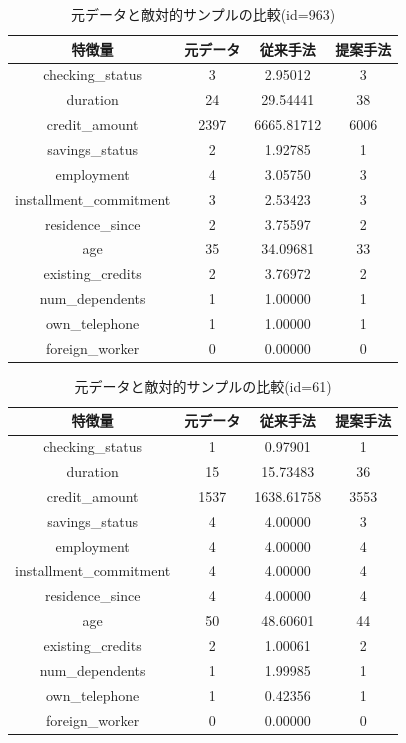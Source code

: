 \begin{table}[H]
    \centering
    \caption{元データと敵対的サンプルの比較(id=963)}
    \begin{tabular}{|c|c|c|c|} \hline
        特徴量 & 元データ & 従来手法 & 提案手法 \\ \hline
        checking\_status & 3 & 2.95012 & 3 \\ \hline
        duration & 24 & 29.54441 & 38 \\ \hline
        credit\_amount & 2397 & 6665.81712 & 6006 \\ \hline
        savings\_status & 2 & 1.92785 & 1 \\ \hline
        employment & 4 & 3.05750 & 3 \\ \hline
        installment\_commitment & 3 & 2.53423 & 3 \\ \hline
        residence\_since & 2 & 3.75597 & 2 \\ \hline
        age & 35 & 34.09681 & 33 \\ \hline
        existing\_credits & 2 & 3.76972 & 2 \\ \hline
        num\_dependents & 1 & 1.00000 & 1 \\ \hline
        own\_telephone & 1 & 1.00000 & 1 \\ \hline
        foreign\_worker & 0 & 0.00000 & 0 \\ \hline
    \end{tabular}
\end{table}

\begin{table}[H]
    \centering
    \caption{元データと敵対的サンプルの比較(id=61)}
    \begin{tabular}{|c|c|c|c|} \hline
        特徴量 & 元データ & 従来手法 & 提案手法 \\ \hline
        checking\_status & 1 & 0.97901 & 1 \\ \hline
        duration & 15 & 15.73483 & 36 \\ \hline
        credit\_amount & 1537 & 1638.61758 & 3553 \\ \hline
        savings\_status & 4 & 4.00000 & 3 \\ \hline
        employment & 4 & 4.00000 & 4 \\ \hline
        installment\_commitment & 4 & 4.00000 & 4 \\ \hline
        residence\_since & 4 & 4.00000 & 4 \\ \hline
        age & 50 & 48.60601 & 44 \\ \hline
        existing\_credits & 2 & 1.00061 & 2 \\ \hline
        num\_dependents & 1 & 1.99985 & 1 \\ \hline
        own\_telephone & 1 & 0.42356 & 1 \\ \hline
        foreign\_worker & 0 & 0.00000 & 0 \\ \hline
    \end{tabular}
\end{table}

